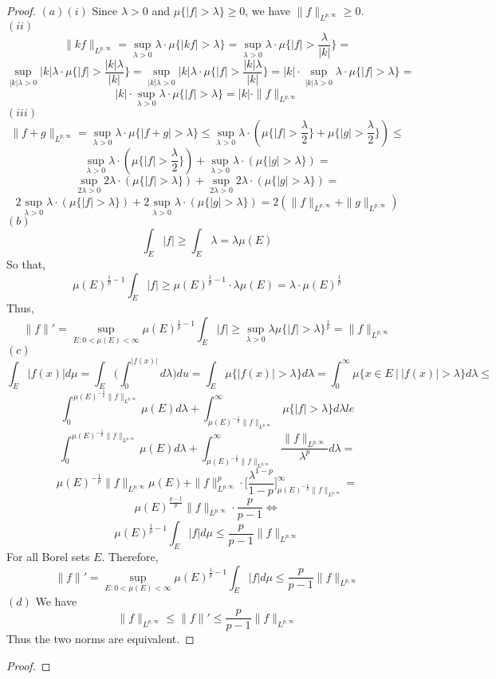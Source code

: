 \documentclass[12pt]{article}
\newenvironment{exercise}[2][Exercise]{\begin{trivlist}
\item[\hskip \labelsep {\bfseries #1}\hskip \labelsep {\bfseries #2.}]}{\end{trivlist}}
\begin{document}
\begin{proof}
  $(a) (i)$ Since $\lambda > 0$ and $\mu\{|f| > \lambda\} \ge 0$, we have $\|f\|_{L^{p, \infty}}\ge 0$.\\
  $(ii)$
  $$\|kf\|_{L^{p, \infty}} = \sup_{\lambda > 0} \lambda \cdot \mu\{|kf| > \lambda\} = \sup_{\lambda > 0} \lambda \cdot \mu\{|f| > \frac{\lambda}{|k|}\} =$$
  $$\sup_{|k|\lambda > 0} |k|\lambda \cdot \mu\{|f| > \frac{|k|\lambda}{|k|}\} = \sup_{|k|\lambda > 0} |k|\lambda \cdot \mu\{|f| > \frac{|k|\lambda}{|k|}\} =
  |k| \cdot \sup_{|k|\lambda > 0} \lambda \cdot \mu\{|f| > \lambda\} =$$
  $$|k| \cdot \sup_{\lambda > 0} \lambda \cdot \mu\{|f| > \lambda\} = |k| \cdot \|f\|_{L^{p, \infty}}$$
  $(iii)$
  $$\|f + g\|_{L^{p, \infty}} = \sup_{\lambda > 0} \lambda \cdot \mu\{|f + g| > \lambda\} \le \sup_{\lambda > 0} \lambda \cdot (\mu\{|f| > \frac{\lambda}{2}\} + \mu\{|g| > \frac{\lambda}{2}\}) \le$$
  $$\sup_{\lambda > 0} \lambda \cdot (\mu\{|f| > \frac{\lambda}{2}\}) + \sup_{\lambda > 0} \lambda \cdot (\mu\{|g| > \lambda\}) =$$
  $$\sup_{2\lambda > 0} 2\lambda \cdot (\mu\{|f| > \lambda\}) + \sup_{2\lambda > 0} 2\lambda \cdot (\mu\{|g| > \lambda\}) =$$
  $$2\sup_{\lambda > 0} \lambda \cdot (\mu\{|f| > \lambda\}) + 2\sup_{\lambda > 0} \lambda \cdot (\mu\{|g| > \lambda\}) = 2 (\|f\|_{L^{p, \infty}} + \|g\|_{L^{p, \infty}})$$
  $(b)$
  $$\int_E |f| \ge \int_E \lambda = \lambda \mu(E)$$
  So that,
  $$\mu(E)^{\frac{1}{p}-1} \int_E |f| \ge \mu(E)^{\frac{1}{p}-1} \cdot \lambda \mu(E) = \lambda \cdot \mu(E)^{\frac{1}{p}}$$
  Thus,
  $$\|f\|' = \sup_{E: 0 < \mu(E) < \infty} \mu(E)^{\frac{1}{p}-1} \int_E |f| \ge \sup_{\lambda > 0} \lambda \mu\{|f| > \lambda\}^{\frac{1}{p}} = \|f\|_{L^{p, \infty}}$$
  $(c)$
  $$\int_E |f(x)| d\mu = \int_E \Big(\int_0^{|f(x)|} d\lambda \Big) du = \int_E \mu\{|f(x)| > \lambda\} d\lambda = \int_0^{\infty} \mu\{x \in E\ |\ |f(x)| > \lambda\} d\lambda \le$$
  $$\int_0^{\mu(E)^{-\frac{1}{p}}\|f\|_{L^{p, \infty}}} \mu(E) d\lambda + \int_{\mu(E)^{-\frac{1}{p}}\|f\|_{L^{p, \infty}}}^{\infty} \mu\{|f| > \lambda\} d\lambda le$$
  $$\int_0^{\mu(E)^{-\frac{1}{p}}\|f\|_{L^{p, \infty}}} \mu(E) d\lambda + \int_{\mu(E)^{-\frac{1}{p}}\|f\|_{L^{p, \infty}}}^{\infty} \dfrac{\|f\|_{L^{p, \infty}}}{\lambda^p} d\lambda = $$
  $$\mu(E)^{-\frac{1}{p}}\|f\|_{L^{p, \infty}}\mu(E) + \|f\|_{L^{p, \infty}}^p \cdot \Big[\dfrac{\lambda^{1-p}}{1-p}\Big]_{\mu(E)^{-\frac{1}{p}}\|f\|_{L^{p, \infty}}}^{\infty} =$$
  $$\mu(E)^{\frac{p-1}{p}} \|f\|_{L^{p, \infty}} \cdot \dfrac{p}{p-1} \iff$$
  $$\mu(E)^{\frac{1}{p} - 1} \int_E |f| d\mu \le \dfrac{p}{p-1} \|f\|_{L^{p, \infty}}$$
  For all Borel sets $E$. Therefore,
  $$\|f\|' = \sup_{E: 0 < \mu(E) < \infty} \mu(E)^{\frac{1}{p} - 1} \int_E |f| d\mu \le \dfrac{p}{p-1} \|f\|_{L^{p, \infty}}$$
  $(d)$ We have
  $$\|f\|_{L^{p, \infty}} \le \|f\|' \le \dfrac{p}{p-1} \|f\|_{L^{p, \infty}}$$
  Thus the two norms are equivalent.
\end{proof}

\begin{exercise}{3}
\end{exercise}

\begin{proof}
\end{proof}
\end{document}
